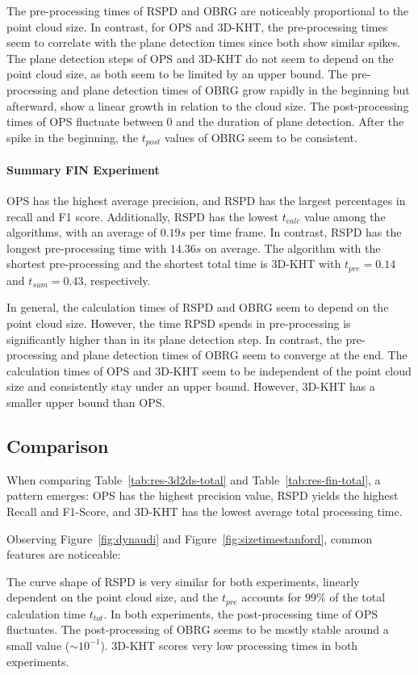 \documentclass[main.tex]{subfiles}
\begin{document}
The pre-processing times of RSPD and OBRG are noticeably proportional to the point cloud size.
In contrast, for OPS and 3D-KHT, the pre-processing times seem to correlate with the plane detection times since
both show similar spikes. The plane detection steps of OPS and 3D-KHT do not seem to depend on the point cloud size,
as both seem to be limited by an upper bound. The pre-processing and plane detection times of OBRG grow rapidly in the
beginning but afterward, show a linear growth in relation to the cloud size. The post-processing times of OPS fluctuate
between 0 and the duration of plane detection. After the spike in the beginning, the $t_{post}$ values of OBRG seem to be
consistent.

\paragraph{Summary FIN Experiment}
OPS has the highest average precision, and RSPD has the largest percentages in recall and F1 score. Additionally, RSPD has the lowest $t_{calc}$ value among the algorithms,
with an average of $0.19s$ per time frame. In contrast, RSPD has the longest pre-processing time with $14.36s$ on average.
The algorithm with the shortest pre-processing and the shortest total time is 3D-KHT with $t_{pre}=0.14$ and $t_{sum}=0.43$,
respectively.


In general, the calculation times of RSPD and OBRG seem to depend on the point cloud size.
However, the time RPSD spends in pre-processing is significantly higher than in its plane detection step.
In contrast, the pre-processing and plane detection times of OBRG seem to converge at the end.
The calculation times of OPS and 3D-KHT seem to be independent of the point cloud size and consistently stay under an upper bound.
However, 3D-KHT has a smaller upper bound than OPS.


\subsection{Comparison}
When comparing Table~\ref{tab:res-3d2ds-total} and Table~\ref{tab:res-fin-total}, a pattern emerges:
OPS has the highest precision value, RSPD yields the highest Recall and F1-Score, and 3D-KHT has the lowest
average total processing time.

Observing Figure~\ref{fig:dynaudi} and Figure~\ref{fig:sizetimestanford}, common features are noticeable:

The curve shape of RSPD is very similar for both experiments, linearly dependent on the point cloud size, and the
$t_{pre}$ accounts for $99\%$ of the total calculation time $t_{tot}$.
In both experiments, the post-processing time of OPS fluctuates.
The post-processing of OBRG seems to be mostly stable around a small value (${\sim}10^{-1}$).
3D-KHT scores very low processing times in both experiments.
\end{document}
